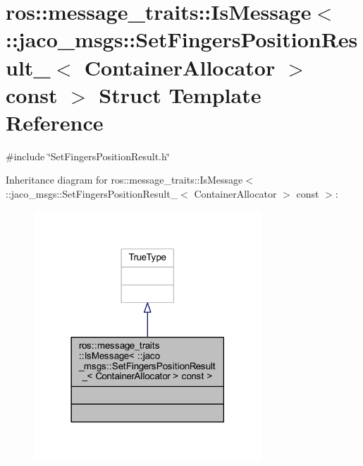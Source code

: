 \hypertarget{structros_1_1message__traits_1_1IsMessage_3_01_1_1jaco__msgs_1_1SetFingersPositionResult___3_01C59348744bb76bac82574dd918cd77dd6}{}\section{ros\+:\+:message\+\_\+traits\+:\+:Is\+Message$<$ \+:\+:jaco\+\_\+msgs\+:\+:Set\+Fingers\+Position\+Result\+\_\+$<$ Container\+Allocator $>$ const $>$ Struct Template Reference}
\label{structros_1_1message__traits_1_1IsMessage_3_01_1_1jaco__msgs_1_1SetFingersPositionResult___3_01C59348744bb76bac82574dd918cd77dd6}


{\ttfamily \#include \char`\"{}Set\+Fingers\+Position\+Result.\+h\char`\"{}}



Inheritance diagram for ros\+:\+:message\+\_\+traits\+:\+:Is\+Message$<$ \+:\+:jaco\+\_\+msgs\+:\+:Set\+Fingers\+Position\+Result\+\_\+$<$ Container\+Allocator $>$ const $>$\+:
\nopagebreak
\begin{figure}[H]
\begin{center}
\leavevmode
\includegraphics[width=242pt]{d5/dc7/structros_1_1message__traits_1_1IsMessage_3_01_1_1jaco__msgs_1_1SetFingersPositionResult___3_01Cf4aafc4d9386ef4fa06deb90ab582974}
\end{center}
\end{figure}


